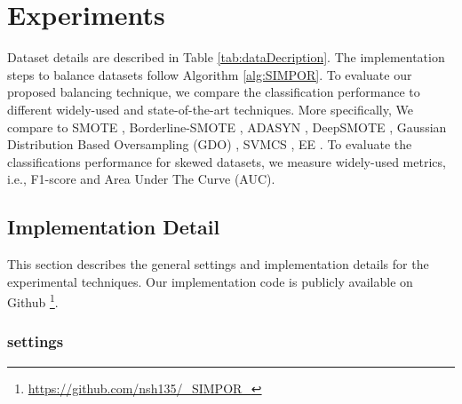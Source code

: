 


\section{Experiments}
\label{sec:experiments}
 Dataset details are described in Table \ref{tab:dataDecription}.  
The implementation steps to balance datasets follow Algorithm \ref{alg:SIMPOR}. To evaluate our proposed balancing technique, we compare the classification performance to different widely-used and state-of-the-art techniques. More specifically, We compare \Methodname{} to SMOTE \cite{chawla_smote:_2002}, Borderline-SMOTE \cite{bordersmote},  ADASYN \cite{ADASYN}, DeepSMOTE \cite{deepsmote}, Gaussian Distribution Based Oversampling (GDO) \cite{bib:GDO}, SVMCS \cite{cssvm}, EE \cite{EE}. To evaluate the classifications performance for skewed datasets, we measure widely-used metrics, i.e., F1-score and Area Under The Curve (AUC). 



\subsection{Implementation Detail}
This section describes the general settings and implementation details for the experimental techniques. Our implementation code is publicly available on Github \footnote{\url{https://github.com/nsh135/_SIMPOR_}}.  


\subsubsection{\Methodname{} settings}

